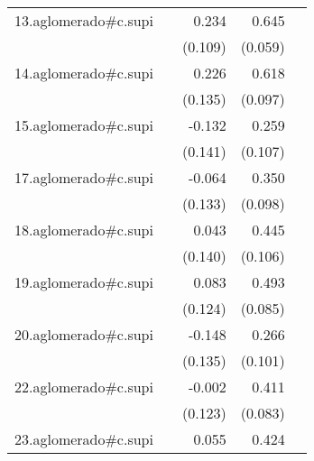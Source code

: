 {\begin{longtable}{l*{4}{D{.}{.}{-1}}}
\addlinespace
13.aglomerado#c.supi&                     &       0.234\sym{*}  &       0.645\sym{***}&                     \\
            &                     &     (0.109)         &     (0.059)         &                     \\
\addlinespace
14.aglomerado#c.supi&                     &       0.226         &       0.618\sym{***}&                     \\
            &                     &     (0.135)         &     (0.097)         &                     \\
\addlinespace
15.aglomerado#c.supi&                     &      -0.132         &       0.259\sym{*}  &                     \\
            &                     &     (0.141)         &     (0.107)         &                     \\
\addlinespace
17.aglomerado#c.supi&                     &      -0.064         &       0.350\sym{***}&                     \\
            &                     &     (0.133)         &     (0.098)         &                     \\
\addlinespace
18.aglomerado#c.supi&                     &       0.043         &       0.445\sym{***}&                     \\
            &                     &     (0.140)         &     (0.106)         &                     \\
\addlinespace
19.aglomerado#c.supi&                     &       0.083         &       0.493\sym{***}&                     \\
            &                     &     (0.124)         &     (0.085)         &                     \\
\addlinespace
20.aglomerado#c.supi&                     &      -0.148         &       0.266\sym{**} &                     \\
            &                     &     (0.135)         &     (0.101)         &                     \\
\addlinespace
22.aglomerado#c.supi&                     &      -0.002         &       0.411\sym{***}&                     \\
            &                     &     (0.123)         &     (0.083)         &                     \\
\addlinespace
23.aglomerado#c.supi&                     &       0.055         &       0.424\sym{***}&                     \\

\end{longtable}}
